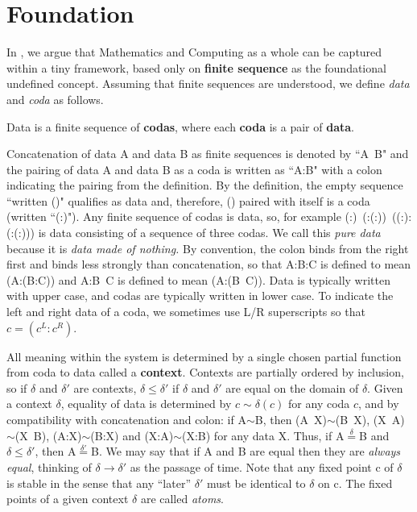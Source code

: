 \documentclass[11pt]{article}
\begin{document}
\section{Foundation}  

In \cite{PDF}, we argue that Mathematics and Computing as a whole can be captured within a tiny framework, based only on {\bf finite sequence} as the foundational undefined concept.  Assuming that finite sequences are understood, we define {\it data} and {\it coda} as follows.   

\begin{definition} {Data is a finite sequence of {\bf codas}, where each {\bf coda} is a pair of {\bf data}.}
\end{definition}

\noindent Concatenation of data A and data B as finite sequences is denoted by ``A\ B" and the pairing of data A and data B as a coda is written as ``A:B" with a colon indicating 
the pairing from the definition.  
By the definition, the empty sequence ``written ()" qualifies as data and, therefore, () paired with itself is a coda (written ``(:)").  Any finite sequence of codas is data, so, for example (:)\ (:(:))\ ((:):(:(:))) is  
data consisting of a sequence of three codas.  We call this {\it pure data} because it is {\it data made of nothing.}  By convention, the colon binds from the right first and binds less strongly than concatenation, so that A:B:C is defined to mean (A:(B:C)) and A:B\ C is defined to mean (A:(B\ C)).  Data is typically written with upper case, and codas are typically written in lower case.  To indicate the left and right data of a coda, we sometimes use L/R superscripts so that $c=(c^L:c^R)$. 

     All meaning within the system is determined by a single chosen partial function from coda to data called a {\bf context}. 
Contexts are partially ordered by inclusion, so if $\delta$ and $\delta'$ are contexts, $\delta\le\delta'$ if $\delta$ and $\delta'$ are equal on the domain of $\delta$.  
Given a context $\delta$, equality of data is determined by $c\sim \delta(c)$ for any coda $c$, and by compatibility with concatenation and colon: if A$\sim$B, then (A\ X)$\sim$(B\ X), (X\ A)$\sim$(X\ B), (A:X)$\sim$(B:X) and (X:A)$\sim$(X:B) for any data X.
Thus, if A${\overset \delta =}$B and $\delta\leq\delta'$, then A${\overset {\delta'} =}$B.  We may say that if A and B are equal then they are {\it always equal}, thinking of $\delta\rightarrow\delta'$ as the passage of time.  Note that any fixed point c of $\delta$ is stable in the sense that any ``later'' $\delta'$ must be identical to $\delta$ on c.  The fixed points of a given context $\delta$ are called {\it atoms}.  
\end{document}
